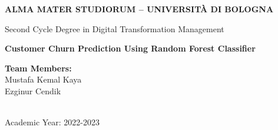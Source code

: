 \begin{titlepage}

	\begin{center}
		\textbf{ALMA MATER STUDIORUM -- UNIVERSITÀ DI BOLOGNA}
		\\
		\noindent\hrulefill
		\vspace{0.4cm}

        \large
		Second Cycle Degree in Digital Transformation Management
		
		\Huge
		\vspace{4cm}
		\textbf{Customer Churn Prediction Using Random Forest Classifier}\\ 
		
		\large		
		\vspace{5.5cm}
		\begin{minipage}[t]{0.64\textwidth}
			\begin{flushleft}
                \vspace{0.2cm}
				
			\end{flushleft}
		\end{minipage}
		\begin{minipage}[t]{0.34\textwidth}
			\begin{flushright}
				\textbf{Team Members:} \\
				\vspace{0.2cm}
                Mustafa Kemal Kaya\\ 
                Ezginur Cendik
			\end{flushright}
		\end{minipage}


		\vfill
		\noindent\hrulefill
		\vspace{0.3cm}
		\large
        \\
		Academic Year: 2022-2023
  
	\end{center}
 
\end{titlepage}
